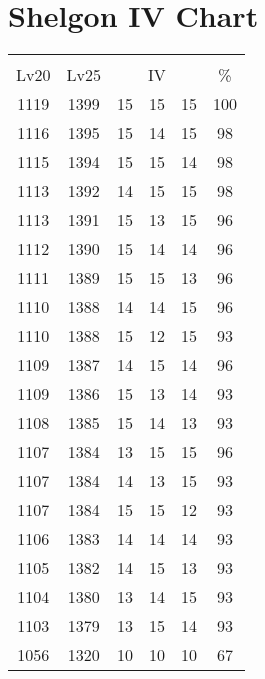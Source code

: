 \documentclass{article}%
\begin{document}
%
\normalsize%
\section{Shelgon IV Chart}%
\label{sec:Shelgon IV Chart}%
\renewcommand{\arraystretch}{1.5}%
\begin{tabular}{|c|c|c|c|c|c|}%
\hline%
\multicolumn{6}{|c|}{\textcolor{white}{ 
\linebreak{Shelgon}
}%
\cellcolor{black}}\\%
\multicolumn{1}{|c}{Lv20}&\multicolumn{1}{c|}{Lv25}&\multicolumn{3}{c|}{IV}&\multicolumn{1}{|c|}{\%}\\%
\hline%
\rowcolor{color100}%
1119&1399&15&15&15&100\\%
\hline%
\rowcolor{color98}%
1116&1395&15&14&15&98\\%
\hline%
\rowcolor{color98}%
1115&1394&15&15&14&98\\%
\hline%
\rowcolor{color98}%
1113&1392&14&15&15&98\\%
\hline%
\rowcolor{color96}%
1113&1391&15&13&15&96\\%
\hline%
\rowcolor{color96}%
1112&1390&15&14&14&96\\%
\hline%
\rowcolor{color96}%
1111&1389&15&15&13&96\\%
\hline%
\rowcolor{color96}%
1110&1388&14&14&15&96\\%
\hline%
\rowcolor{color93}%
1110&1388&15&12&15&93\\%
\hline%
\rowcolor{color96}%
1109&1387&14&15&14&96\\%
\hline%
\rowcolor{color93}%
1109&1386&15&13&14&93\\%
\hline%
\rowcolor{color93}%
1108&1385&15&14&13&93\\%
\hline%
\rowcolor{color96}%
1107&1384&13&15&15&96\\%
\hline%
\rowcolor{color93}%
1107&1384&14&13&15&93\\%
\hline%
\rowcolor{color93}%
1107&1384&15&15&12&93\\%
\hline%
\rowcolor{color93}%
1106&1383&14&14&14&93\\%
\hline%
\rowcolor{color93}%
1105&1382&14&15&13&93\\%
\hline%
\rowcolor{color93}%
1104&1380&13&14&15&93\\%
\hline%
\rowcolor{color93}%
1103&1379&13&15&14&93\\%
\hline%
\rowcolor{color91}%
1056&1320&10&10&10&67\\%
\end{tabular}

%
\end{document}
